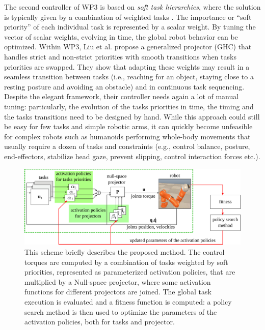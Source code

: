 The second controller of WP3 is based on \textit{soft task hierarchies}, where
the solution is typically given by a combination of weighted tasks
\cite{Salini-2011-ID348}. The importance or ``soft priority'' of each individual
task is represented by a scalar weight. By tuning the vector of scalar weights,
evolving in time, the global robot behavior can be optimized. Within WP3, Liu et
al. \cite{liu_ICRA2015} propose a generalized projector (GHC) that handles
strict and non-strict priorities with smooth transitions when tasks priorities
are swapped. They show that adapting these weights may result in a seamless
transition between tasks (i.e., reaching for an object, staying close to a
resting posture and avoiding an obstacle) and in continuous task sequencing.
Despite the elegant framework, their controller needs again a lot of manual
tuning: particularly, the evolution of the tasks priorities in time, the timing
and the tasks transitions need to be designed by hand. While this approach could
still be easy for few tasks and simple robotic arms, it can quickly become
unfeasible for complex robots such as humanoids performing whole-body movements
that usually require a dozen of tasks and constraints (e.g., control balance,
posture, end-effectors, stabilize head gaze, prevent slipping, control
interaction forces etc.).

\begin{figure}%
\centering
\includegraphics[width=\linewidth]{./sections/WP4/pics_serena/concept_scheme}
\caption{This scheme briefly describes the proposed method. The control torques are computed by a combination of tasks weighted by soft priorities, represented as parameterized activation policies, that are multiplied by a Null-space projector, where some activation functions for different projectors are joined. The global task execution is evaluated and a fitness function is computed: a policy search method is then used to optimize the parameters of the activation policies, both for tasks and projector. }
\label{figure:scheme}
\end{figure}

